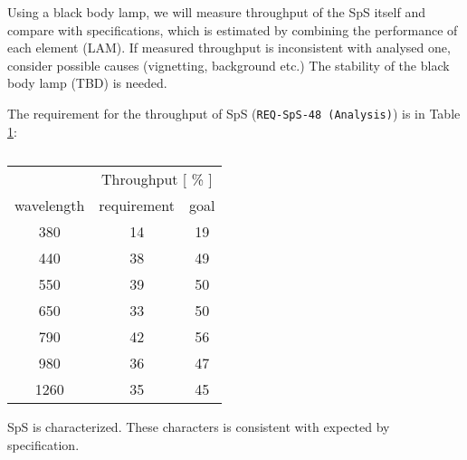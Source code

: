 \smallskip

Using a black body lamp, we will measure throughput of the SpS itself and compare with specifications, which is estimated by combining the performance of each element (LAM).
If measured throughput is inconsistent with analysed one, consider possible causes (vignetting, background etc.) 
The stability of the black body lamp (TBD) is needed.

The requirement for the throughput of SpS ({\tt REQ-SpS-48 (Analysis)}) is in Table \ref{tab:SpSthroughput}:
\begin{table}[!ht]
\begin{center}
\caption{}
\label{tab:SpSthroughput}
\begin{tabular}{c|cc}  \hline
 & \multicolumn{2}{c}{Throughput [ \% ]} \\
wavelength &  requirement & goal \\ \hline \hline
380 & 14 & 19 \\
440 & 38 & 49 \\
550 & 39 & 50 \\
650 & 33 & 50 \\
790 & 42 & 56 \\
980 & 36 & 47 \\
1260 & 35 & 45 \\  \hline
\end{tabular}
\end{center}
\end{table}

\begin{itembox}[l]{}
SpS is characterized. These characters is consistent with expected by specification.
\end{itembox}